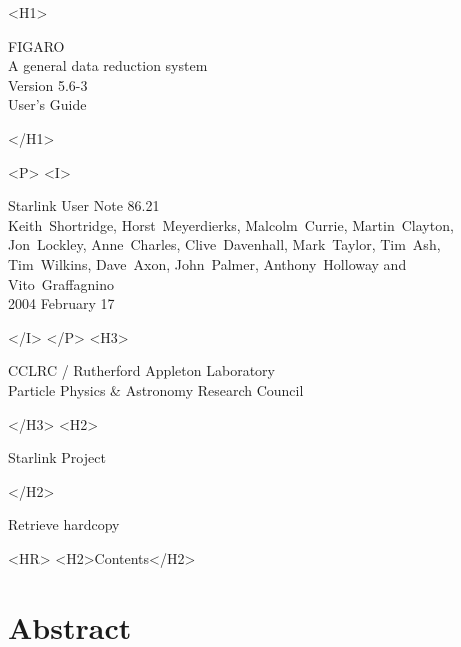 \documentclass[11pt,twoside]{article}
\newcommand{\Figaroversion}{5.6-3~}
\newcommand{\stardoccategory}  {Starlink User Note}
\newcommand{\stardocsource}    {sun\stardocnumber}
\newcommand{\stardocnumber}    { 86.21}
\newcommand{\stardocauthors}   {Keith~Shortridge, Horst~Meyerdierks,
                                Malcolm~Currie, Martin~Clayton, Jon~Lockley,
                                Anne~Charles, Clive~Davenhall,
                                Mark~Taylor, Tim~Ash, Tim~Wilkins, Dave~Axon,
                                John~Palmer, Anthony~Holloway and
                                Vito~Graffagnino}
\newcommand{\stardocdate}      {2004 February 17}
\newcommand{\stardoctitle}     {FIGARO \\ [1ex] A general data reduction system}
\newcommand{\stardocversion}   {Version \Figaroversion}
\newcommand{\stardocmanual}    {User's Guide}
\newcommand{\htmladdnormallink}[2]{#1}
\newcommand{\htmladdimg}[1]{}
\newcommand{\htmlref}[2]{#1}
\newcommand{\htmladdtonavigation}[1]{}
\newcommand{\xlabel}[1]{}
\newcommand{\latexonlytoc}[0]{\tableofcontents}
\begin{document}
\begin{htmlonly}
   \xlabel{}
   \begin{rawhtml} <H1> \end{rawhtml}
      \stardoctitle\\
      \stardocversion\\
      \stardocmanual
   \begin{rawhtml} </H1> \end{rawhtml}


   \begin{rawhtml} <P> <I> \end{rawhtml}
   \stardoccategory \stardocnumber \\
   \stardocauthors \\
   \stardocdate
   \begin{rawhtml} </I> </P> <H3> \end{rawhtml}
      \htmladdnormallink{CCLRC}{http://www.cclrc.ac.uk} /
      \htmladdnormallink{Rutherford Appleton Laboratory}
                        {http://www.cclrc.ac.uk/ral} \\
      \htmladdnormallink{Particle Physics \& Astronomy Research Council}
                        {http://www.pparc.ac.uk} \\
   \begin{rawhtml} </H3> <H2> \end{rawhtml}
      \htmladdnormallink{Starlink Project}{http://www.starlink.ac.uk/}
   \begin{rawhtml} </H2> \end{rawhtml}
   \htmladdnormallink{\htmladdimg{source.gif} Retrieve hardcopy}
      {http://www.starlink.ac.uk/cgi-bin/hcserver?\stardocsource}\\

  \label{stardoccontents}
  \begin{rawhtml}
    <HR>
    <H2>Contents</H2>
  \end{rawhtml}
  \newcommand{\latexonlytoc}[0]{}
  \htmladdtonavigation{\htmlref{\htmladdimg{contents_motif.gif}}
        {stardoccontents}}

  \section{\xlabel{abstract}Abstract}
\end{htmlonly}
\end{document}
